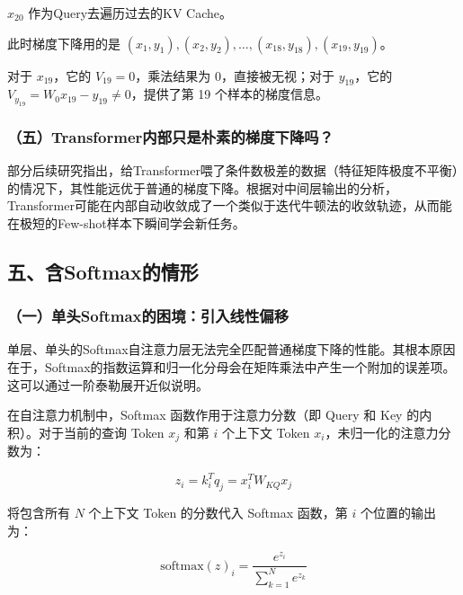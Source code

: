 \(x_{20}\) 作为Query去遍历过去的KV Cache。

此时梯度下降用的是 \((x_1,y_1),(x_2,y_2),\ldots,(x_{18},y_{18}),(x_{19},y_{19})\)。

对于 \(x_{19}\)，它的 \(V_{19}=0\)，乘法结果为 \(0\)，直接被无视；对于 \(y_{19}\)，它的 \(V_{y_{19}}=W_0x_{19}-y_{19}\ne 0\)，提供了第 19 个样本的梯度信息。

\hypertarget{ux4e94transformerux5185ux90e8ux53eaux662fux6734ux7d20ux7684ux68afux5ea6ux4e0bux964dux5417}{%
\subsubsection{（五）Transformer内部只是朴素的梯度下降吗？}\label{ux4e94transformerux5185ux90e8ux53eaux662fux6734ux7d20ux7684ux68afux5ea6ux4e0bux964dux5417}}

部分后续研究指出，给Transformer喂了条件数极差的数据（特征矩阵极度不平衡）的情况下，其性能远优于普通的梯度下降。根据对中间层输出的分析，Transformer可能在内部自动收敛成了一个类似于迭代牛顿法的收敛轨迹，从而能在极短的Few-shot样本下瞬间学会新任务。

\hypertarget{ux4e94ux542bsoftmaxux7684ux60c5ux5f62}{%
\subsection{五、含Softmax的情形}\label{ux4e94ux542bsoftmaxux7684ux60c5ux5f62}}

\hypertarget{ux4e00ux5355ux5934softmaxux7684ux56f0ux5883ux5f15ux5165ux7ebfux6027ux504fux79fb}{%
\subsubsection{（一）单头Softmax的困境：引入线性偏移}\label{ux4e00ux5355ux5934softmaxux7684ux56f0ux5883ux5f15ux5165ux7ebfux6027ux504fux79fb}}

单层、单头的Softmax自注意力层无法完全匹配普通梯度下降的性能。其根本原因在于，Softmax的指数运算和归一化分母会在矩阵乘法中产生一个附加的误差项。这可以通过一阶泰勒展开近似说明。

在自注意力机制中，Softmax 函数作用于注意力分数（即 Query 和 Key 的内积）。对于当前的查询 Token \(x_j\) 和第 \(i\) 个上下文 Token \(x_i\)，未归一化的注意力分数为：

\[
z_i = k_i^T q_j = x_i^T W_{KQ}x_j
\]

将包含所有 \(N\) 个上下文 Token 的分数代入 Softmax 函数，第 \(i\) 个位置的输出为：

\[
\mathrm{softmax}(z)_i = \frac{e^{z_i}}{\sum_{k=1}^{N} e^{z_k}}
\]

